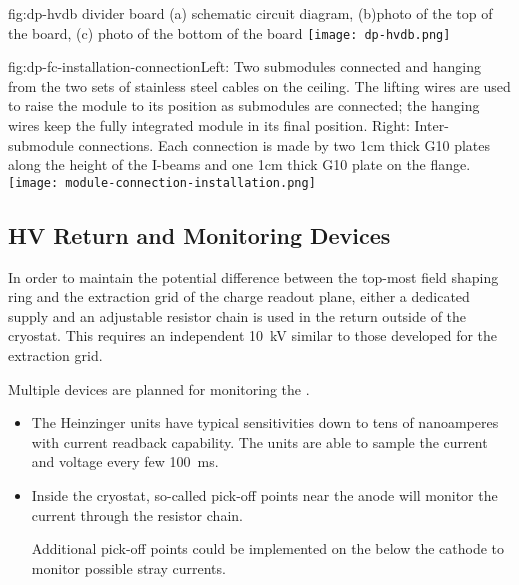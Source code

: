 \begin{dunefigure}{fig:dp-hvdb}{  divider board (a) schematic circuit diagram, (b)photo of the top of the board, (c) photo of the bottom of the board}
\texttt{[image: dp-hvdb.png]}
\end{dunefigure}


\begin{dunefigure}{fig:dp-fc-installation-connection}{Left: Two submodules connected and hanging from the two sets of stainless steel cables on the ceiling.  The lifting wires are used to raise the module to its position as submodules are connected; the hanging wires keep the fully integrated module in its final position.  Right: Inter-submodule connections.  Each connection is made by two \num{1}{cm} thick G10 plates along the height of the I-beams and one \num{1}{cm} thick G10 plate on the flange.}
\texttt{[image: module-connection-installation.png]}
\end{dunefigure}


\subsection{HV Return and Monitoring Devices}

In order to maintain the potential difference between the top-most field shaping ring and the extraction grid of the charge readout plane, either a dedicated  supply and an adjustable resistor chain is used in the  return outside of the cryostat.  This requires an independent \SI{10}{kV} \fdth similar to those developed for the extraction grid.

Multiple devices are planned for monitoring the .  
\begin{itemize}
\item The Heinzinger units have typical sensitivities down to tens of nanoamperes with current readback capability.  The units are able to sample the current and voltage every few \SI{100}{\milli\s}.  
\item Inside the cryostat, so-called pick-off points near the anode will monitor the current through the  resistor chain.  

Additional pick-off points could be implemented on the  below the cathode to monitor possible stray currents.
\end{itemize}
\noindent 


